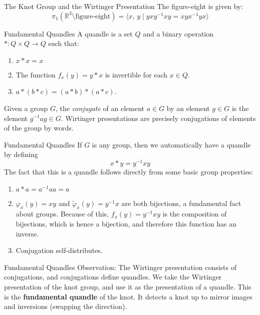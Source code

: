 \documentclass{beamer}
\begin{document}
    \begin{frame}{The Knot Group and the Wirtinger Presentation}
        The figure-eight is given by:
        \begin{equation}
            \pi_{1}(\mathbb{R}^{3}\setminus\textrm{figure-eight})
            =\langle
                x,\,y\;|\;yxy^{-1}xy=xyx^{-1}yx
            \rangle
        \end{equation}
    \end{frame}
    \begin{frame}{Fundamental Quandles}
        A quandle is a set $Q$ and a binary operation
        $*:Q\times{Q}\rightarrow{Q}$ such that:
        \begin{enumerate}
            \item
                $x*x=x$
            \item
                The function $f_{x}(y)=y*x$ is invertible for each $x\in{Q}$.
            \item
                $a*(b*c)=(a*b)*(a*c)$.
        \end{enumerate}
        Given a group $G$, the \textit{conjugate} of an element
        $a\in{G}$ by an element $g\in{G}$ is the element
        $g^{-1}ag\in{G}$. Wirtinger presentations are precisely conjugations
        of elements of the group by words.
    \end{frame}
    \begin{frame}{Fundamental Quandles}
        If $G$ is any group, then we automatically have a quandle by defining
        \begin{equation}
            x*y=y^{-1}xy
        \end{equation}
        The fact that this is a quandle follows directly from some basic
        group properties:
        \begin{enumerate}
            \item
                $a*a=a^{-1}aa=a$
            \item
                $\varphi_{x}(y)=xy$ and $\tilde{\varphi}_{x}(y)=y^{-1}x$
                are both bijections, a fundamental fact about groups.
                Because of this, $f_{x}(y)=y^{-1}xy$ is the composition of
                bijections, which is hence a bijection, and therefore this
                function has an inverse.
            \item
                Conjugation self-distributes.
        \end{enumerate}
    \end{frame}
    \begin{frame}{Fundamental Quandles}
        Observation: The Wirtinger presentation consists of conjugations,
        and conjugations define quandles. We take the Wirtinger presentation
        of the knot group, and use it as the presentation of a quandle.
        This is the \textbf{fundamental quandle} of the knot. It detects
        a knot up to mirror images and inversions (swapping the direction).
    \end{frame}
\end{document}
